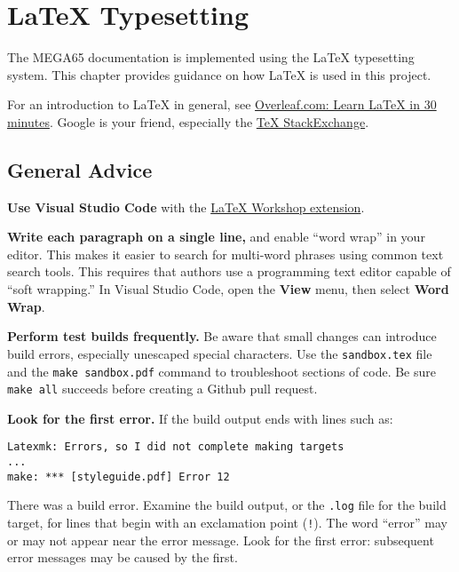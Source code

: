 
\chapter{LaTeX Typesetting}

The MEGA65 documentation is implemented using the LaTeX typesetting system. This chapter provides guidance on how LaTeX is used in this project.

For an introduction to LaTeX in general, see \href{https://www.overleaf.com/learn/latex/Learn_LaTeX_in_30_minutes}{Overleaf.com: Learn LaTeX in 30 minutes}. Google is your friend, especially the \href{https://tex.stackexchange.com/}{TeX StackExchange}.

\section{General Advice}

\textbf{Use Visual Studio Code} with the \href{https://marketplace.visualstudio.com/items?itemName=James-Yu.latex-workshop}{LaTeX Workshop extension}.

\textbf{Write each paragraph on a single line,} and enable ``word wrap'' in your editor. This makes it easier to search for multi-word phrases using common text search tools. This requires that authors use a programming text editor capable of ``soft wrapping.'' In Visual Studio Code, open the \textbf{View} menu, then select \textbf{Word Wrap}.

\textbf{Perform test builds frequently.} Be aware that small changes can introduce build errors, especially unescaped special characters. Use the \texttt{sandbox.tex} file and the \texttt{make sandbox.pdf} command to troubleshoot sections of code. Be sure \texttt{make all} succeeds before creating a Github pull request.

\textbf{Look for the first error.} If the build output ends with lines such as:

\begin{verbatim}
Latexmk: Errors, so I did not complete making targets
...
make: *** [styleguide.pdf] Error 12
\end{verbatim}

There was a build error. Examine the build output, or the \texttt{.log} file for the build target, for lines that begin with an exclamation point (\texttt{!}). The word ``error'' may or may not appear near the error message. Look for the first error: subsequent error messages may be caused by the first.

